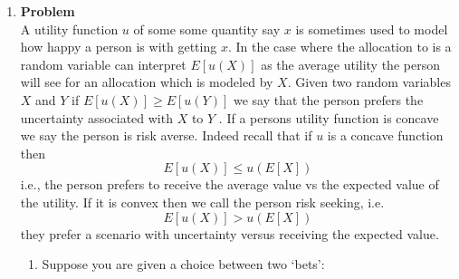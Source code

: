 \documentclass[12pt]{article}
\newenvironment{Ex}{\textbf{Problem}\vspace{.75em}\\}{}
\begin{document}
\begin{enumerate}
\begin{Ex}
      indeed true. In this problem we consider this further in the
      case of convex functions. A function is convex if for all $x, y
      \in R$ and for any $\lambda \in [0, 1]$ we have that
      $$ g(\lambda x + (1-\lambda)y) \le \lambda g(x) +
      (1-\lambda)g(y)$$
      If $-g$ is convex, then we say that $g$ is concave.
      \begin{enumerate}
      \item Use the above definition to draw a representative convex
        and concave functions.
      \item Suppose $X$ is a discrete random variable that takes two
        values only and $g$ is convex. Show that $E[g(X)] \ge
        g(E[X])$. It follows that if $g$ is concave then $E[g(X)] \le
        g(E[X])$.
      \item This result is true in general, i.e., for any kind of
        random variable. To convince yourself, can you extend this
        result to the case $X$ a discrete random variables that takes
        three values? Hint: you could perhaps condition...
      \end{enumerate}
      \begin{solution} \hfill \\
        {\huge TODO}
      \end{solution}
    \end{Ex}
  \item 
    \begin{Ex}
      A utility function $u$ of some some quantity say $x$ is sometimes
      used to model how happy a person is with getting $x$. In the case
      where the allocation to is a random variable can interpret
      $E[u(X)]$ as the average utility the person will see for an
      allocation which is modeled by $X$. Given two random variables $X$
      and $Y$ if $E [u(X)] \ge E [u(Y)]$ we say that the person prefers
      the uncertainty associated with $X$ to $Y$ . If a persons utility
      function is concave we say the person is risk averse. Indeed
      recall that if $u$ is a concave function then
      $$ E[u(X)] \le u(E[X]) $$
      i.e., the person prefers to receive the average value vs the
      expected value of the utility. If it is convex then we call the
      person risk seeking, i.e.
      $$ E[u(X)] \gt u(E[X]) $$
      they prefer a scenario with uncertainty versus receiving the expected value.
      \begin{enumerate}
      \item Suppose you are given a choice between two `bets':

\end{enumerate}
\end{Ex}
\end{enumerate}
\end{document}
